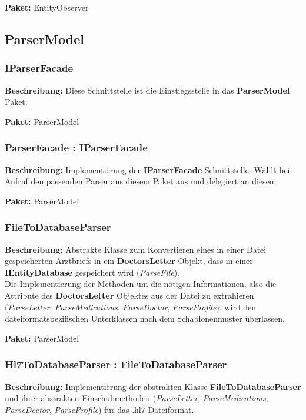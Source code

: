 \documentclass[a4paper]{scrreprt}
\begin{document}
\textbf{Paket:} EntityObserver


\subsection{ParserModel}

\subsubsection{IParserFacade}
\textbf{Beschreibung:} Diese Schnittstelle ist die Einstiegsstelle in das \textbf{ParserModel} Paket. 

\textbf{Paket:} ParserModel

\subsubsection{ParserFacade : IParserFacade}
\textbf{Beschreibung:} Implementierung der \textbf{IParserFacade} Schnittstelle. Wählt bei Aufruf den passenden Parser aus diesem Paket aus und delegiert an diesen.

\textbf{Paket:} ParserModel

\subsubsection{FileToDatabaseParser}
\textbf{Beschreibung:} Abstrakte Klasse zum Konvertieren eines in einer Datei gespeicherten Arztbriefs in ein \textbf{DoctorsLetter} Objekt, dass in einer \textbf{IEntityDatabase} gespeichert wird (\textit{ParseFile}).\\
Die Implementierung der Methoden um die nötigen Informationen, also die Attribute des \textbf{DoctorsLetter} Objektes aus der Datei zu extrahieren (\textit{ParseLetter}, \textit{ParseMedications}, \textit{ParseDoctor}, \textit{ParseProfile}), wird den dateiformatspezifischen Unterklassen nach dem Schablonenmuster überlassen.

\textbf{Paket:} ParserModel

\subsubsection{Hl7ToDatabaseParser : FileToDatabaseParser}
\textbf{Beschreibung:} Implementierung der abstrakten Klasse \textbf{FileToDatabaseParser} und ihrer abstrakten Einschubmethoden (\textit{ParseLetter}, \textit{ParseMedications}, \textit{ParseDoctor}, \textit{ParseProfile}) für das .hl7 Dateiformat.
\end{document}
